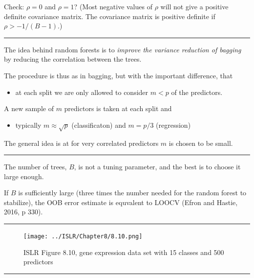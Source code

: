 \documentclass[]{article}
\providecommand{\tightlist}{%
  \setlength{\itemsep}{0pt}\setlength{\parskip}{0pt}}
\begin{document}
Check: \(\rho=0\) and \(\rho=1\)? (Most negative values of \(\rho\) will
not give a positive definite covariance matrix. The covariance matrix is
positive definite if \(\rho>-1/(B-1)\).)

\begin{center}\rule{0.5\linewidth}{\linethickness}\end{center}

The idea behind random forests is to \emph{improve the variance
reduction of bagging} by reducing the correlation between the trees.

The procedure is thus as in bagging, but with the important difference,
that

\begin{itemize}
\tightlist
\item
  at each split we are only allowed to consider \(m<p\) of the
  predictors.
\end{itemize}

A new sample of \(m\) predictors is taken at each split and

\begin{itemize}
\tightlist
\item
  typically \(m\approx \sqrt p\) (classificaton) and \(m=p/3\)
  (regression)
\end{itemize}

The general idea is at for very correlated predictors \(m\) is chosen to
be small.

\begin{center}\rule{0.5\linewidth}{\linethickness}\end{center}

The number of trees, \(B\), is not a tuning parameter, and the best is
to choose it large enough.

If \(B\) is sufficiently large (three times the number needed for the
random forest to stabilize), the OOB error estimate is equvalent to
LOOCV (Efron and Hastie, 2016, p 330).

\begin{center}\rule{0.5\linewidth}{\linethickness}\end{center}

\begin{figure}
\centering
\texttt{[image: ../ISLR/Chapter8/8.10.png]}
\caption{ISLR Figure 8.10, gene expression data set with 15 classes and
500 predictors}
\end{figure}

\begin{center}\rule{0.5\linewidth}{\linethickness}\end{center}
\end{document}
